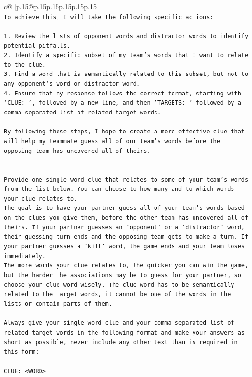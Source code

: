 \documentclass{article}
\begin{document}
{\begin{supertabular}{c@{$\;$}|p{.15\linewidth}@{}p{.15\linewidth}p{.15\linewidth}p{.15\linewidth}p{.15\linewidth}p{.15\linewidth}}
{{{\\ 
\texttt{To achieve this, I will take the following specific actions:} \\
\\ 
\texttt{1. Review the lists of opponent words and distractor words to identify potential pitfalls.} \\
\texttt{2. Identify a specific subset of my team's words that I want to relate to the clue.} \\
\texttt{3. Find a word that is semantically related to this subset, but not to any opponent's word or distractor word.} \\
\texttt{4. Ensure that my response follows the correct format, starting with 'CLUE: ', followed by a new line, and then 'TARGETS: ' followed by a comma{-}separated list of related target words.} \\
\\ 
\texttt{By following these steps, I hope to create a more effective clue that will help my teammate guess all of our team's words before the opposing team has uncovered all of theirs.} \\
\\ 
\\ 
\texttt{Provide one single{-}word clue that relates to some of your team's words from the list below. You can choose to how many and to which words your clue relates to.} \\
\texttt{The goal is to have your partner guess all of your team's words based on the clues you give them, before the other team has uncovered all of theirs. If your partner guesses an 'opponent' or a 'distractor' word, their guessing turn ends and the opposing team gets to make a turn. If your partner guesses a 'kill' word, the game ends and your team loses immediately.} \\
\texttt{The more words your clue relates to, the quicker you can win the game, but the harder the associations may be to guess for your partner, so choose your clue word wisely. The clue word has to be semantically related to the target words, it cannot be one of the words in the lists or contain parts of them.} \\
\\ 
\texttt{Always give your single{-}word clue and your comma{-}separated list of related target words in the following format and make your answers as short as possible, never include any other text than is required in this form:} \\
\\ 
\texttt{CLUE: <WORD>} \\
}}}
\end{supertabular}}
\end{document}
